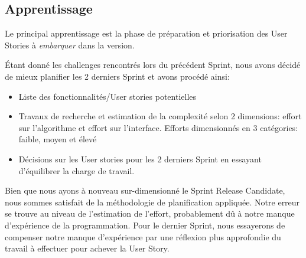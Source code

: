 \subsection{Apprentissage}

Le principal apprentissage est la phase de préparation et priorisation des User Stories 
à \emph{embarquer} dans la version.

Étant donné les challenges rencontrés lors du précédent Sprint, nous avons décidé de mieux planifier 
les 2 derniers Sprint et avons procédé ainsi:
\begin{itemize}
    \item Liste des fonctionnalités/User stories potentielles
    \item Travaux de recherche et estimation de la complexité selon 2 dimensions: effort sur 
    l'algorithme et effort sur l’interface. Efforts dimensionnés en 3 catégories: faible, moyen et élevé
    \item Décisions sur les User stories pour les 2 derniers Sprint en essayant d'équilibrer la charge de travail.
\end{itemize}
Bien que nous ayons à nouveau sur-dimensionné le Sprint Release Candidate, nous sommes satisfait 
de la méthodologie de planification appliquée. Notre erreur se trouve au niveau de l’estimation 
de l’effort, probablement dû à notre manque d'expérience de la programmation. Pour le dernier Sprint, 
nous essayerons de compenser notre manque d'expérience par une réflexion plus approfondie du travail 
à effectuer pour achever la User Story.

